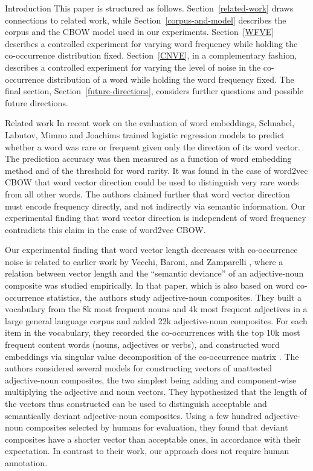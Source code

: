 \documentclass{article} %
\begin{document}
\begin{section}{Introduction}
This paper is structured as follows.  Section~\ref{related-work} draws
connections to related work, while Section~\ref{corpus-and-model} describes
the corpus and the CBOW model used in our experiments.
Section~\ref{WFVE} describes a controlled experiment for varying word
frequency while holding the co-occurrence distribution fixed.
Section~\ref{CNVE}, in a complementary fashion, describes a controlled
experiment for varying the level of noise in the co-occurrence
distribution of a word while holding the word frequency fixed.  The
final section, Section~\ref{future-directions}, considers further questions
and possible future directions.
\end{section}

\begin{section}{Related work}\label{related-work}
In recent work on the evaluation of word embeddings, Schnabel, Labutov, Mimno
and Joachims \cite{schnabelemnlp2015} trained logistic regression models to
predict whether a word was rare or frequent given only the direction of its
word vector.  The prediction accuracy was then measured as a function of word
embedding method and of the threshold for word rarity.  It was found in the
case of word2vec CBOW that word vector direction could be used to distinguish
very rare words from all other words. The authors claimed further that word
vector direction must encode frequency directly, and not indirectly via
semantic information.  Our experimental finding that word vector direction is
independent of word frequency contradicts this claim in the case of word2vec
CBOW.

Our experimental finding that word vector length decreases with co-occurrence
noise is related to earlier work by Vecchi, Baroni, and Zamparelli
\cite{vecchi-baroni-zamparelli2011}, where a relation between vector length and
the ``semantic deviance'' of an adjective-noun composite was studied
empirically.  In that paper, which is also based on word co-occurrence
statistics, the authors study adjective-noun composites.  They built a
vocabulary from the 8k most frequent nouns and 4k most frequent adjectives in a
large general language corpus and added 22k adjective-noun composites.  For
each item in the vocabulary, they recorded the co-occurrences with the top 10k
most frequent content words (nouns, adjectives or verbs), and constructed word
embeddings via singular value decomposition of the co-occurrence matrix
\cite{landauer-dumais1997}.  The authors considered several models for
constructing vectors of unattested adjective-noun composites, the two simplest
being adding and component-wise multiplying the adjective and noun vectors.
They hypothesized that the length of the vectors thus constructed can be used
to distinguish acceptable and semantically deviant adjective-noun composites.
Using a few hundred adjective-noun composites selected by humans for
evaluation, they found that deviant composites have a shorter vector than
acceptable ones, in accordance with their expectation.  In contrast to their
work, our approach does not require human annotation.


\end{section}
\end{document}
